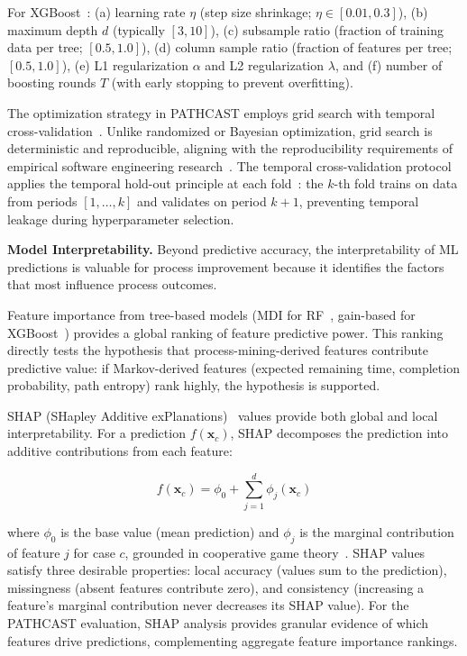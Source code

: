 For XGBoost~\cite{chen2016xgboost}: (a) learning rate $\eta$ (step size
shrinkage; $\eta \in [0.01, 0.3]$), (b) maximum depth $d$ (typically $[3, 10]$),
(c) subsample ratio (fraction of training data per tree; $[0.5, 1.0]$),
(d) column sample ratio (fraction of features per tree; $[0.5, 1.0]$),
(e) L1 regularization $\alpha$ and L2 regularization $\lambda$, and
(f) number of boosting rounds $T$ (with early stopping to prevent overfitting).

The optimization strategy in PATHCAST employs grid search with temporal
cross-validation~\cite{bergstra2012random, tashman2000out}. Unlike randomized
or Bayesian optimization, grid search is deterministic and reproducible,
aligning with the reproducibility requirements of empirical software
engineering research~\cite{bergstra2012random}. The temporal cross-validation
protocol applies the temporal hold-out principle at each
fold~\cite{tashman2000out}: the $k$-th fold trains on data from periods
$[1, \ldots, k]$ and validates on period $k + 1$, preventing temporal leakage
during hyperparameter selection.

\textbf{Model Interpretability.} Beyond predictive accuracy, the
interpretability of ML predictions is valuable for process improvement because
it identifies the factors that most influence process outcomes.

Feature importance from tree-based models (MDI for
RF~\cite{breiman2001random}, gain-based for
XGBoost~\cite{chen2016xgboost}) provides a global ranking of feature
predictive power. This ranking directly tests the hypothesis that
process-mining-derived features contribute predictive value: if Markov-derived
features (expected remaining time, completion probability, path entropy) rank
highly, the hypothesis is supported.

SHAP (SHapley Additive exPlanations)~\cite{lundberg2017unified} values provide
both global and local interpretability. For a prediction $f(\mathbf{x}_c)$,
SHAP decomposes the prediction into additive contributions from each feature:

\begin{equation}
f(\mathbf{x}_c) = \phi_0 + \sum_{j=1}^{d} \phi_j(\mathbf{x}_c)
\end{equation}

\noindent where $\phi_0$ is the base value (mean prediction) and $\phi_j$ is
the marginal contribution of feature $j$ for case $c$, grounded in cooperative
game theory~\cite{lundberg2017unified}. SHAP values satisfy three desirable
properties: local accuracy (values sum to the prediction), missingness (absent
features contribute zero), and consistency (increasing a feature's marginal
contribution never decreases its SHAP value). For the PATHCAST evaluation,
SHAP analysis provides granular evidence of which features drive predictions,
complementing aggregate feature importance rankings.


